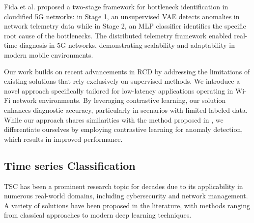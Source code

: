 Fida et al. \cite{fida2023bottleneck} proposed a two-stage framework for bottleneck identification in cloudified 5G networks: in Stage 1, an unsupervised \ac{VAE} detects anomalies in network telemetry data while in Stage 2, an MLP classifier identifies the specific root cause of the bottlenecks. The distributed telemetry framework enabled real-time diagnosis in 5G networks, demonstrating scalability and adaptability in modern mobile environments.

Our work builds on recent advancements in \ac{RCD} by addressing the limitations of existing solutions that rely exclusively on supervised methods. We introduce a novel approach specifically tailored for low-latency applications operating in Wi-Fi network environments. By leveraging contrastive learning, our solution enhances diagnostic accuracy, particularly in scenarios with limited labeled data. While our approach shares similarities with the method proposed in \cite{fida2023bottleneck}, we differentiate ourselves by employing contrastive learning for anomaly detection, which results in improved performance.



\subsection{Time series Classification}
\ac{TSC} has been a prominent research topic for decades due to its applicability in numerous real-world domains, including cybersecurity and network management. A variety of solutions have been proposed in the literature, with methods ranging from classical approaches to modern deep learning techniques.

